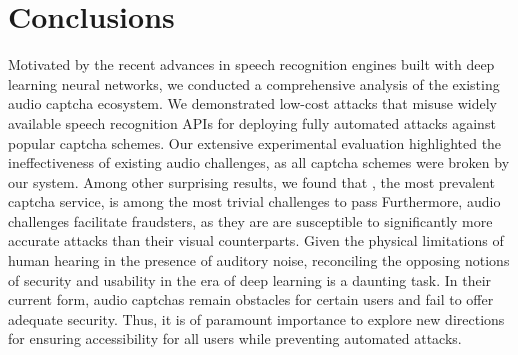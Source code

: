 \section{Conclusions}
\label{sec:conclusions}

Motivated by the recent advances in speech recognition engines 
built with deep learning neural networks, we conducted a comprehensive 
analysis of the existing audio captcha ecosystem. We demonstrated low-cost attacks that misuse
widely available speech recognition APIs for deploying fully automated attacks
against \no popular captcha schemes. Our extensive experimental evaluation
highlighted the ineffectiveness of existing audio challenges, as all captcha
schemes were broken by our \system system. Among other surprising results,
we found that \re, the most prevalent captcha service, is among the most 
trivial challenges to pass  Furthermore, \re audio challenges facilitate 
fraudsters, as they are are susceptible to significantly more accurate attacks
than their visual counterparts. Given the physical limitations of human hearing
in the presence of auditory noise, reconciling the opposing notions of security 
and usability in the era of deep learning is a daunting task. In their current form,
audio captchas remain obstacles for certain users and fail to offer adequate security.
Thus, it is of paramount importance to explore new directions for ensuring accessibility
for all users while preventing automated attacks.


